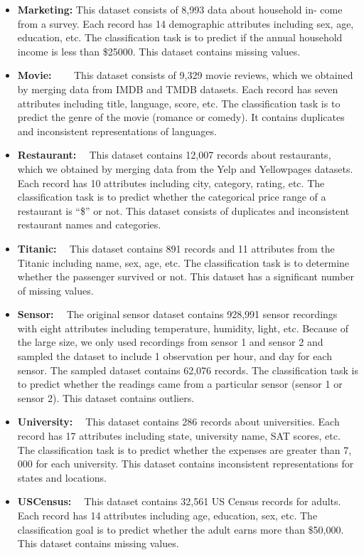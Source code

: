 \begin{itemize}
\item {
	\textbf{Marketing:}
	This dataset consists of 8,993 data about household in-
	come from a survey. Each record has 14 demographic attributes including sex, age, education, etc. The classification task is to predict
	if the annual household income is less than \$25000. This dataset contains missing values.
}

\item {
	\textbf{Movie: ~\cite{TMDBmovie2019} ~\cite{IMDBmovie2019}}
	This dataset consists of 9,329 movie reviews, which
	we obtained by merging data from IMDB and TMDB datasets.
	Each record has seven attributes including title, language, score,
	etc. The classification task is to predict the genre of the movie
	(romance or comedy). 
	It contains duplicates and inconsistent representations of languages.
}

\item{
	\textbf{Restaurant: ~\cite{RestaurantDataset2019}}
	This dataset contains 12,007 records about restaurants, which we obtained by merging data from the Yelp and Yellowpages datasets. Each record has 10 attributes including city, category, rating, etc. The classification task is to predict whether the
	categorical price range of a restaurant is “\$” or not. This dataset
	consists of duplicates and inconsistent restaurant names and categories.
}

\item {
	\textbf{Titanic: ~\cite{Titanic2019}}
	This dataset contains 891 records and 11 attributes from the Titanic including name, sex, age, etc. The classification
	task is to determine whether the passenger survived or not. This dataset has a significant number of missing values.
}

\item {
	\textbf{Sensor: ~\cite{SensorDataset2019}}
	The original sensor dataset contains 928,991 sensor recordings with eight attributes including temperature, humidity, light, etc. Because of the large size, we only used recordings from
sensor 1 and sensor 2 and sampled the dataset to include 1 observation per hour, and day for each 	sensor. The sampled dataset contains 62,076 records. The classification task is to predict whether
	the readings came from a particular sensor (sensor 1 or sensor 2). This dataset contains outliers.
}

\item {
	\textbf{University: ~\cite{University:2019}}
	This dataset contains 286 records about universities. Each record has 17 attributes including state, university name,
	SAT scores, etc. The classification task is to predict whether the
	expenses are greater than 7, 000 for each university. This dataset
	contains inconsistent representations for states and locations.
}

\item  {
	\textbf{USCensus: ~\cite{USCensusData:2019}}
	This dataset contains 32,561 US Census records
	for adults. Each record has 14 attributes including age, education,
	sex, etc. The classification goal is to predict whether the adult earns
	more than \$50,000. This dataset contains missing values.
}

\end{itemize}

